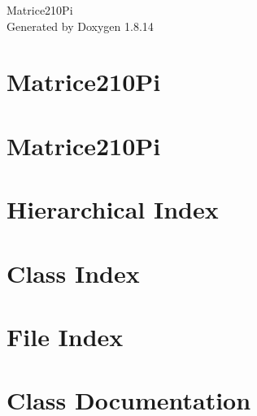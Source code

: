 \documentclass[twoside]{book}
\newcommand{\+}{\discretionary{\mbox{\scriptsize$\hookleftarrow$}}{}{}}
\newcommand{\clearemptydoublepage}{%
  \newpage{\pagestyle{empty}\cleardoublepage}%
}
\begin{document}
\hypersetup{pageanchor=false,
             bookmarksnumbered=true,
             pdfencoding=unicode
            }
\begin{titlepage}
\vspace*{7cm}
\begin{center}%
{\Large Matrice210\+Pi }\\
\vspace*{1cm}
{\large Generated by Doxygen 1.8.14}\\
\end{center}
\end{titlepage}
\clearemptydoublepage
{}
\tableofcontents
\clearemptydoublepage
{}
\hypersetup{pageanchor=true}

\chapter{Matrice210\+Pi}
\label{index}\hypertarget{index}{}
\chapter{Matrice210\+Pi}
\label{md__r_e_a_d_m_e}

\chapter{Hierarchical Index}

\chapter{Class Index}

\chapter{File Index}

\chapter{Class Documentation}






















\end{document}
